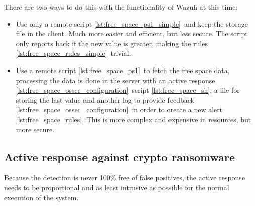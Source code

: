 \linej
There are two ways to do this with the functionality of Wazuh at this time:
\begin{itemize}
	\item Use only a remote script \ref{lst:free_space_ps1_simple}\ and keep the storage file in the client. Much more easier and efficient, but less secure. The script only reports back if the new value is greater, making the rules \ref{lst:free_space_rules_simple}\ trivial.
	\item Use a remote script \ref{lst:free_space_ps1}\ to fetch the free space data, processing the data is done in the server with an active response \ref{lst:free_space_ossec_configuration}\ script \ref{lst:free_space_sh}, a file for storing the last value and another log to provide feedback \ref{lst:free_space_ossec_configuration}\ in order to create a new alert \ref{lst:free_space_rules}. This is more complex and expensive in resources, but more secure.
\end{itemize}

\subsection{Active response against crypto ransomware}
Because the detection is never 100\% free of false positives, the active response needs to be proportional and as least intrusive as possible for the normal execution of the system.



